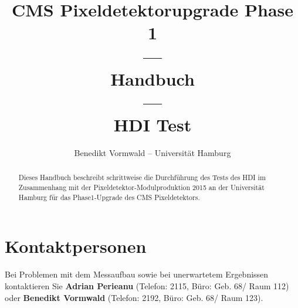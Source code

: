\documentclass[a4paper,12pt,pointlessnumbers]{scrartcl}
\title{CMS Pixeldetektorupgrade Phase 1\\---\\Handbuch\\---\\HDI Test}
\author{Benedikt Vormwald -- Universit\"{a}t Hamburg}
\begin{document}
\maketitle
\begin{abstract}
Dieses Handbuch beschreibt schrittweise die Durchf\"{u}hrung des Tests des HDI im Zusammenhang mit der Pixeldetektor-Modulproduktion 2015 an der Universit\"{a}t Hamburg f\"{u}r das Phase1-Upgrade des CMS Pixeldetektors.
\end{abstract}

\tableofcontents
\newpage

\section{Kontaktpersonen}
Bei Problemen mit dem Messaufbau sowie bei unerwartetem Ergebnissen kontaktieren Sie
\textbf{Adrian Perieanu} (Telefon: 2115, B{\"u}ro: Geb. 68/ Raum 112) oder \textbf{Benedikt Vormwald} (Telefon: 2192, B{\"u}ro: Geb. 68/ Raum 123).
\end{document}
